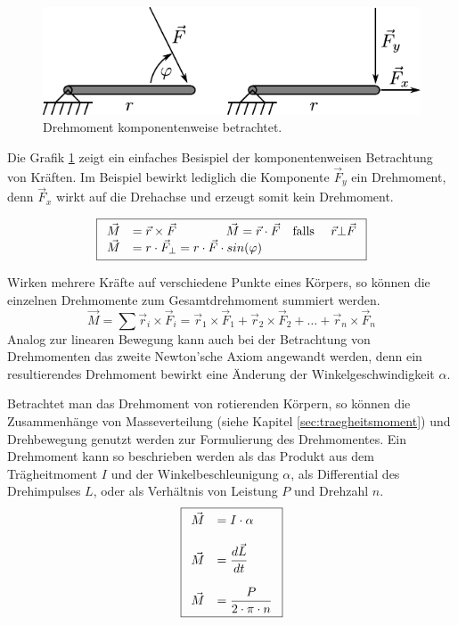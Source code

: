 \begin{figure}[h!]
	\centering
	\includegraphics[scale=0.8]{drehmoment.pdf}
	\caption{Drehmoment komponentenweise betrachtet.}
	\label{fig:drehmoment}
\end{figure}

\noindent
Die Grafik \ref{fig:drehmoment} zeigt ein einfaches Besispiel der
komponentenweisen Betrachtung von Kräften. Im Beispiel bewirkt lediglich
die Komponente $\vec{F}_y$ ein Drehmoment, denn $\vec{F}_x$ wirkt auf
die Drehachse und erzeugt somit kein Drehmoment.

\[ \boxed{\begin{array}{l l} 
	\vec{M} &= \vec{r} \times \vec{F}
			\qquad \qquad
		\vec{M} = \vec{r} \cdot \vec{F}
			\quad \text{falls } \quad \vec{r} \bot \vec{F} \\
	\vec{M} &
		= r \cdot \vec{F}_\bot 
		= r \cdot \vec{F} \cdot sin(\varphi) \\
\end{array} }\]

\noindent
Wirken mehrere Kräfte auf verschiedene Punkte eines Körpers, so können
die einzelnen Drehmomente zum Gesamtdrehmoment summiert werden.
\[ \boxed{
	\vec{M} = \sum \vec{r}_i \times \vec{F}_i
	= \vec{r}_1 \times \vec{F}_1 
		+ \vec{r}_2 \times \vec{F}_2
		+ \dots 
		+ \vec{r}_n \times \vec{F}_n 
} \]
Analog zur linearen Bewegung kann auch bei der Betrachtung von Drehmomenten
das zweite Newton'sche Axiom angewandt werden, denn ein resultierendes
Drehmoment bewirkt eine Änderung der Winkelgeschwindigkeit $\alpha$.

Betrachtet man das Drehmoment von rotierenden Körpern, so können die
Zusammenhänge von Masseverteilung (siehe Kapitel 
\ref{sec:traegheitsmoment}) und Drehbewegung genutzt werden zur
Formulierung des Drehmomentes. Ein Drehmoment kann so beschrieben werden
als das Produkt aus dem Trägheitmoment $I$ und der Winkelbeschleunigung
$\alpha$, als Differential des Drehimpulses $L$, oder als Verhältnis von 
Leistung $P$ und Drehzahl $n$.
\[ \boxed{\begin{array}{r l}
	\vec{M} & = \displaystyle I \cdot \alpha \\
	& \\
	\vec{M} & = \displaystyle \frac{d\vec{L}}{dt} \\
	& \\
	\vec{M} & = \displaystyle \frac{P}{2 \cdot \pi \cdot n}
\end{array} }\]


